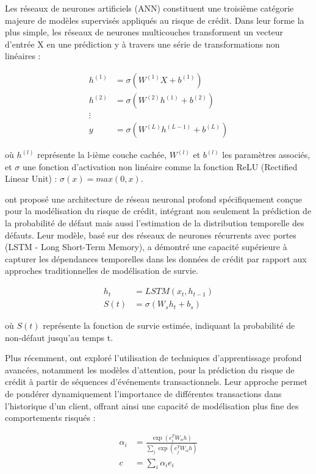 Les réseaux de neurones artificiels (ANN) constituent une troisième catégorie majeure de modèles supervisés appliqués au risque de crédit. Dans leur forme la plus simple, les réseaux de neurones multicouches transforment un vecteur d'entrée X en une prédiction y à travers une série de transformations non linéaires :

\begin{align}
h^{(1)} &= \sigma(W^{(1)}X + b^{(1)}) \\
h^{(2)} &= \sigma(W^{(2)}h^{(1)} + b^{(2)}) \\
\vdots \\
y &= \sigma(W^{(L)}h^{(L-1)} + b^{(L)})
\end{align}

où $h^{(l)}$ représente la l-ième couche cachée, $W^{(l)}$ et $b^{(l)}$ les paramètres associés, et $\sigma$ une fonction d'activation non linéaire comme la fonction ReLU (Rectified Linear Unit) : $\sigma(x) = max(0, x)$.

\citet{kvamme2018} ont proposé une architecture de réseau neuronal profond spécifiquement conçue pour la modélisation du risque de crédit, intégrant non seulement la prédiction de la probabilité de défaut mais aussi l'estimation de la distribution temporelle des défauts. Leur modèle, basé sur des réseaux de neurones récurrents avec portes (LSTM - Long Short-Term Memory), a démontré une capacité supérieure à capturer les dépendances temporelles dans les données de crédit par rapport aux approches traditionnelles de modélisation de survie.

\begin{align}
h_t &= LSTM(x_t, h_{t-1})\\
S(t) &= \sigma(W_s h_t + b_s)
\end{align}

où $S(t)$ représente la fonction de survie estimée, indiquant la probabilité de non-défaut jusqu'au temps t.

Plus récemment, \citet{babaev2019} ont exploré l'utilisation de techniques d'apprentissage profond avancées, notamment les modèles d'attention, pour la prédiction du risque de crédit à partir de séquences d'événements transactionnels. Leur approche permet de pondérer dynamiquement l'importance de différentes transactions dans l'historique d'un client, offrant ainsi une capacité de modélisation plus fine des comportements risqués :

\begin{align}
\alpha_i &= \frac{\exp(e_i^T W_{\alpha} h)}{\sum_j \exp(e_j^T W_{\alpha} h)}\\
c &= \sum_i \alpha_i e_i
\end{align}

